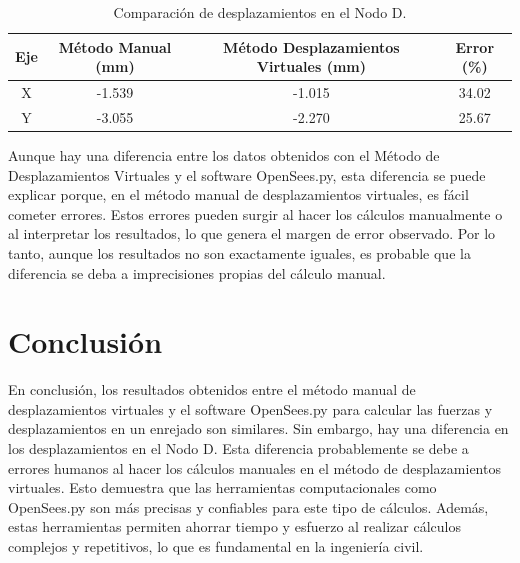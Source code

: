 \documentclass{article}  %
\begin{document}
\begin{table}[h!]
  \centering
  \begin{tabular}{cccc}
  \hline
  \textbf{Eje} & \textbf{Método Manual (mm)} & \textbf{ Método Desplazamientos Virtuales (mm)} & \textbf{Error (\%)} \\
  \hline
  X & -1.539 & -1.015 & 34.02\\
  Y & -3.055 & -2.270 & 25.67\\
  \hline
  \end{tabular}
  \caption{Comparación de desplazamientos en el Nodo D.}
\end{table}

Aunque hay una diferencia entre los datos obtenidos con el Método de Desplazamientos Virtuales y el software OpenSees.py, esta diferencia se puede explicar porque, en el método manual de desplazamientos virtuales, es fácil cometer errores. Estos errores pueden surgir al hacer los cálculos manualmente o al interpretar los resultados, lo que genera el margen de error observado. Por lo tanto, aunque los resultados no son exactamente iguales, es probable que la diferencia se deba a imprecisiones propias del cálculo manual.

\newpage

\section{Conclusión}
En conclusión, los resultados obtenidos entre el método manual de desplazamientos virtuales y el software OpenSees.py para calcular las fuerzas y desplazamientos en un enrejado son similares. Sin embargo, hay una diferencia en los desplazamientos en el Nodo D. Esta diferencia probablemente se debe a errores humanos al hacer los cálculos manuales en el método de desplazamientos virtuales. Esto demuestra que las herramientas computacionales como OpenSees.py son más precisas y confiables para este tipo de cálculos. Además, estas herramientas permiten ahorrar tiempo y esfuerzo al realizar cálculos complejos y repetitivos, lo que es fundamental en la ingeniería civil.
\end{document}
